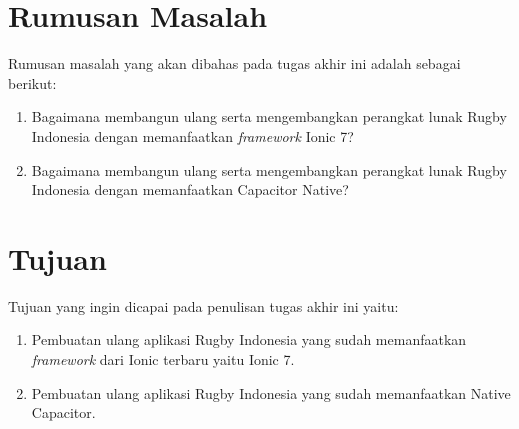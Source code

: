 

\section{Rumusan Masalah}
\label{sec:rumusan}
Rumusan masalah yang akan dibahas pada tugas akhir ini adalah sebagai berikut:
\begin{enumerate}
    \item Bagaimana membangun ulang serta mengembangkan perangkat lunak Rugby Indonesia dengan memanfaatkan \textit{framework} Ionic 7?
    \item Bagaimana membangun ulang serta mengembangkan perangkat lunak Rugby Indonesia dengan memanfaatkan Capacitor Native?
\end{enumerate}


\section{Tujuan}
\label{sec:tujuan}
Tujuan yang ingin dicapai pada penulisan tugas akhir ini yaitu:
\begin{enumerate}
    \item Pembuatan ulang aplikasi Rugby Indonesia yang sudah memanfaatkan \textit{framework} dari Ionic terbaru yaitu Ionic 7.
    \item Pembuatan ulang aplikasi Rugby Indonesia yang sudah memanfaatkan Native Capacitor.
\end{enumerate}


